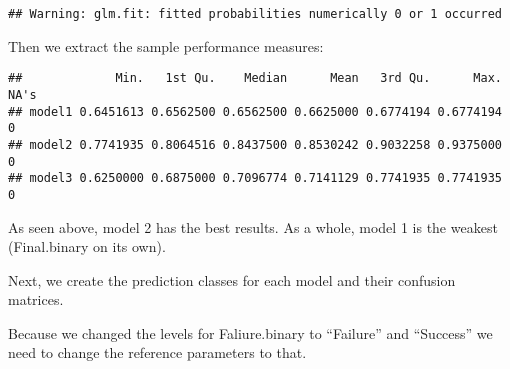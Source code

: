 \documentclass[
]{article}
\newenvironment{Shaded}{\begin{snugshade}}{\end{snugshade}}
\newcommand{\AttributeTok}[1]{\textcolor[rgb]{0.77,0.63,0.00}{#1}}
\newcommand{\CommentTok}[1]{\textcolor[rgb]{0.56,0.35,0.01}{\textit{#1}}}
\newcommand{\FunctionTok}[1]{\textcolor[rgb]{0.00,0.00,0.00}{#1}}
\newcommand{\NormalTok}[1]{#1}
\newcommand{\OtherTok}[1]{\textcolor[rgb]{0.56,0.35,0.01}{#1}}
\newcommand{\SpecialCharTok}[1]{\textcolor[rgb]{0.00,0.00,0.00}{#1}}
\newcommand{\StringTok}[1]{\textcolor[rgb]{0.31,0.60,0.02}{#1}}
\begin{document}
\begin{verbatim}
## Warning: glm.fit: fitted probabilities numerically 0 or 1 occurred
\end{verbatim}

Then we extract the sample performance measures:

\begin{Shaded}
\end{Shaded}

\begin{verbatim}
##             Min.   1st Qu.    Median      Mean   3rd Qu.      Max. NA's
## model1 0.6451613 0.6562500 0.6562500 0.6625000 0.6774194 0.6774194    0
## model2 0.7741935 0.8064516 0.8437500 0.8530242 0.9032258 0.9375000    0
## model3 0.6250000 0.6875000 0.7096774 0.7141129 0.7741935 0.7741935    0
\end{verbatim}

As seen above, model 2 has the best results. As a whole, model 1 is the
weakest (Final.binary on its own).

Next, we create the prediction classes for each model and their
confusion matrices.

Because we changed the levels for Faliure.binary to ``Failure'' and
``Success'' we need to change the reference parameters to that.

\begin{Shaded}
\end{Shaded}
\end{document}
